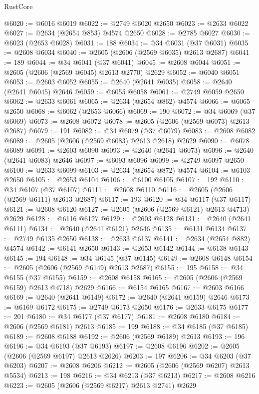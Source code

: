 \begin{lexlean}{RustCore}
\begin{coremodule}
@6020 := @6016 @6019
@6022 := @2749 @6020 @2650
@6023 := @2633 @6022
@6027 := @2634 (@2654 @853) @4574 @2650
@6028 := @2785 @6027
@6030 := @6023 (@2653 @6028)
@6031 := 188
@6034 := @34 @6031 (@37 @6031)
@6035 := @2608 @6034
@6040 := @2605 (@2606 (@2569 @6035) @2613 @2687)
@6041 := 189
@6044 := @34 @6041 (@37 @6041)
@6045 := @2608 @6044
@6051 := @2605 (@2606 (@2569 @6045) @2613 @2770) @2629
@6052 := @6040 @6051
@6053 := @2603 @6052
@6055 := @2640 (@2641 @6035)
@6058 := @2640 (@2641 @6045) @2646
@6059 := @6055 @6058
@6061 := @2749 @6059 @2650
@6062 := @2633 @6061
@6065 := @2634 (@2654 @862) @4574
@6066 := @6065 @2650
@6068 := @6062 (@2653 @6066)
@6069 := 190
@6072 := @34 @6069 (@37 @6069)
@6073 := @2608 @6072
@6078 := @2605 (@2606 (@2569 @6073) @2613 @2687)
@6079 := 191
@6082 := @34 @6079 (@37 @6079)
@6083 := @2608 @6082
@6089 := @2605 (@2606 (@2569 @6083) @2613 @2618) @2629
@6090 := @6078 @6089
@6091 := @2603 @6090
@6093 := @2640 (@2641 @6073)
@6096 := @2640 (@2641 @6083) @2646
@6097 := @6093 @6096
@6099 := @2749 @6097 @2650
@6100 := @2633 @6099
@6103 := @2634 (@2654 @872) @4574
@6104 := @6103 @2650
@6105 := @2653 @6104
@6106 := @6100 @6105
@6107 := 192
@6110 := @34 @6107 (@37 @6107)
@6111 := @2608 @6110
@6116 := @2605 (@2606 (@2569 @6111) @2613 @2687)
@6117 := 193
@6120 := @34 @6117 (@37 @6117)
@6121 := @2608 @6120
@6127 := @2605 (@2606 (@2569 @6121) @2613 @4713) @2629
@6128 := @6116 @6127
@6129 := @2603 @6128
@6131 := @2640 (@2641 @6111)
@6134 := @2640 (@2641 @6121) @2646
@6135 := @6131 @6134
@6137 := @2749 @6135 @2650
@6138 := @2633 @6137
@6141 := @2634 (@2654 @882) @4574
@6142 := @6141 @2650
@6143 := @2653 @6142
@6144 := @6138 @6143
@6145 := 194
@6148 := @34 @6145 (@37 @6145)
@6149 := @2608 @6148
@6154 := @2605 (@2606 (@2569 @6149) @2613 @2687)
@6155 := 195
@6158 := @34 @6155 (@37 @6155)
@6159 := @2608 @6158
@6165 := @2605 (@2606 (@2569 @6159) @2613 @4718) @2629
@6166 := @6154 @6165
@6167 := @2603 @6166
@6169 := @2640 (@2641 @6149)
@6172 := @2640 (@2641 @6159) @2646
@6173 := @6169 @6172
@6175 := @2749 @6173 @2650
@6176 := @2633 @6175
@6177 := 201
@6180 := @34 @6177 (@37 @6177)
@6181 := @2608 @6180
@6184 := @2606 (@2569 @6181) @2613
@6185 := 199
@6188 := @34 @6185 (@37 @6185)
@6189 := @2608 @6188
@6192 := @2606 (@2569 @6189) @2613
@6193 := 196
@6196 := @34 @6193 (@37 @6193)
@6197 := @2608 @6196
@6202 := @2605 (@2606 (@2569 @6197) @2613 @2626)
@6203 := 197
@6206 := @34 @6203 (@37 @6203)
@6207 := @2608 @6206
@6212 := @2605 (@2606 (@2569 @6207) @2613 @5534)
@6213 := 198
@6216 := @34 @6213 (@37 @6213)
@6217 := @2608 @6216
@6223 := @2605 (@2606 (@2569 @6217) @2613 @2741) @2629

\end{coremodule}
\end{lexlean}
